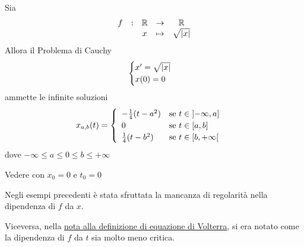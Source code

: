 \begin{example}
	Sia
	$$\begin{array}{ccccc} {f} & : & {\mathbb{R}} & \to & {\mathbb{R}} \\ & & {x} & \mapsto & {\sqrt{\left|x\right|}} \\ \end{array}$$
	Allora il Problema di Cauchy
	\begin{equation*}
		\begin{cases}
			x' = \sqrt{\left|x\right|}\\
			x(0) = 0
		\end{cases}
	\end{equation*}
	ammette le infinite soluzioni
	\begin{equation*}
		x_{a,b}(t) =
		\begin{cases}
			\begin{array}{ll}
				-\frac{1}{4}(t-a^2) & \text{se } t \in \left]-\infty,a\right]\\
				0 & \text{se } t \in \left[a,b\right]\\
				\frac{1}{4}(t-b^2) & \text{se } t \in \left[b,+\infty\right[
			\end{array}
		\end{cases}
	\end{equation*}
	dove $-\infty \leq a \leq 0 \leq b \leq +\infty$
	\begin{solution}
		Vedere  con $x_0 = 0$ e $t_0 = 0$
	\end{solution}
\end{example}
\begin{observation}
	Negli esempi precedenti è stata sfruttata la mancanza di regolarità nella dipendenza di $f$ da $x$.

	Viceversa, nella \hyperlink{note:volterra_non_cont}{nota alla definizione di equazione di Volterra}, si era notato come la dipendenza di $f$ da $t$ sia molto meno critica.
\end{observation}
